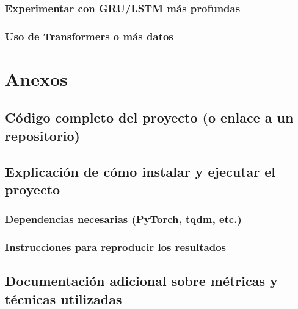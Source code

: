 \documentclass{article}
\begin{document}
\subsubsection{Experimentar con GRU/LSTM más profundas}
\subsubsection{Uso de Transformers o más datos}

\section{Anexos}
\subsection{Código completo del proyecto (o enlace a un repositorio)}
\subsection{Explicación de cómo instalar y ejecutar el proyecto}
\subsubsection{Dependencias necesarias (PyTorch, tqdm, etc.)}
\subsubsection{Instrucciones para reproducir los resultados}
\subsection{Documentación adicional sobre métricas y técnicas utilizadas}

\newpage

\nocite{*}
\printbibliography
\end{document}

